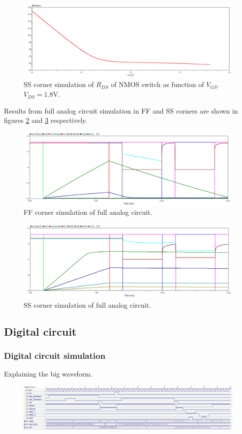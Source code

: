\begin{figure}
    \centering
    \includegraphics[width=\textwidth]{graphs/corner_ss_simulation.png}
    \caption{SS corner simulation of $R_{DS}$ of NMOS switch as function of $V_{GS}$. $V_{DS} = 1.8\mathrm{V}$.}
    \label{fig:ss}
\end{figure}

Results from full analog circuit simulation in FF and SS corners are shown in figures \ref{fig:ffFull} and \ref{fig:ssFull} respectively.

\begin{figure}
    \centering
    \includegraphics[width=\textwidth]{graphs/analogWaveform_ff.png}
    \caption{FF corner simulation of full analog circuit.}
    \label{fig:ffFull}
\end{figure}

\begin{figure}
    \centering
    \includegraphics[width=\textwidth]{graphs/analogWaveform_ss.png}
    \caption{SS corner simulation of full analog circuit.}
    \label{fig:ssFull}
\end{figure}

\subsection{Digital circuit}

\subsubsection{Digital circuit simulation}

Explaining the big waveform.

\begin{figure}
    \centering
    \includegraphics[width=\textwidth]{graphs/digital_waveform.png}
\end{figure}
